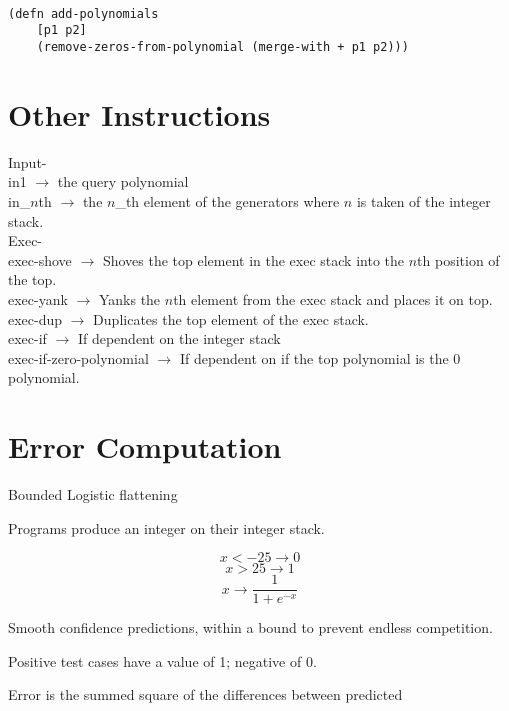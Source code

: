 \documentclass[20pt]{extarticle}
\begin{document}
\begin{verbatim}

(defn add-polynomials
    [p1 p2]
    (remove-zeros-from-polynomial (merge-with + p1 p2)))

\end{verbatim}

\newpage
\section*{Other Instructions}

\noindent Input- \\
\indent in1 $\rightarrow$ the query polynomial \\
\indent in\_$n$th $\rightarrow$ the $n$\_th element of the generators where $n$ is taken of the integer stack. \\

\noindent Exec- \\
\indent exec-shove $\rightarrow$ Shoves the top element in the exec stack into the $n$th position of the top. \\
\indent exec-yank $\rightarrow$ Yanks the $n$th element from the exec stack and places it on top. \\
\indent exec-dup $\rightarrow$ Duplicates the top element of the exec stack. \\
\indent exec-if $\rightarrow$ If dependent on the integer stack \\
\indent exec-if-zero-polynomial $\rightarrow$ If dependent on if the top polynomial is the 0 polynomial. \\

\newpage
\section*{Error Computation}

\noindent Bounded Logistic flattening

\noindent Programs produce an integer on their integer stack. 

 $$x < -25 \rightarrow 0 $$
 $$x > 25  \rightarrow 1 $$
 $$x \rightarrow \frac{1}{1+e^{-x}}$$

\noindent Smooth confidence predictions, within a bound to prevent endless competition. 

\noindent Positive test cases have a value of 1; negative of 0.

\noindent Error is the summed square of the differences between predicted 

\end{document}
